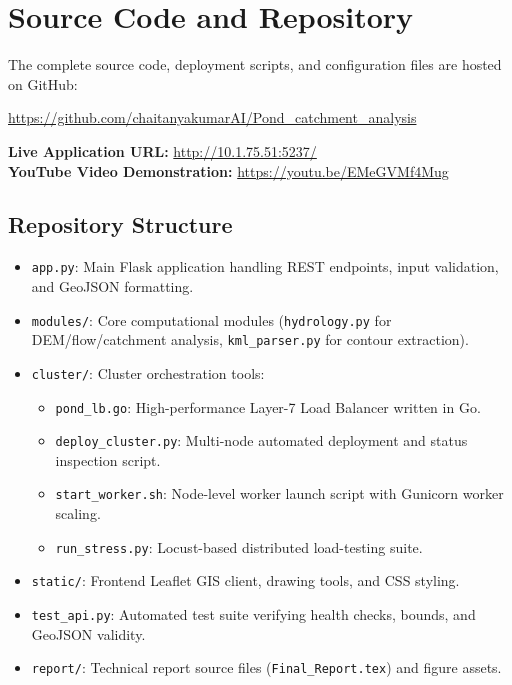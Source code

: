 \documentclass[manuscript,screen,review]{acmart}
\begin{document}
\appendix

\section{Source Code and Repository}
\label{sec:repo}
The complete source code, deployment scripts, and configuration files are hosted on GitHub:
\begin{center}
\url{https://github.com/chaitanyakumarAI/Pond_catchment_analysis}
\end{center}
\textbf{Live Application URL:} \url{http://10.1.75.51:5237/} \\
\textbf{YouTube Video Demonstration:} \url{https://youtu.be/EMeGVMf4Mug}

\subsection{Repository Structure}
\begin{itemize}
    \item \texttt{app.py}: Main Flask application handling REST endpoints, input validation, and GeoJSON formatting.
    \item \texttt{modules/}: Core computational modules (\texttt{hydrology.py} for DEM/flow/catchment analysis, \texttt{kml\_parser.py} for contour extraction).
    \item \texttt{cluster/}: Cluster orchestration tools:
    \begin{itemize}
        \item \texttt{pond\_lb.go}: High-performance Layer-7 Load Balancer written in Go.
        \item \texttt{deploy\_cluster.py}: Multi-node automated deployment and status inspection script.
        \item \texttt{start\_worker.sh}: Node-level worker launch script with Gunicorn worker scaling.
        \item \texttt{run\_stress.py}: Locust-based distributed load-testing suite.
    \end{itemize}
    \item \texttt{static/}: Frontend Leaflet GIS client, drawing tools, and CSS styling.
    \item \texttt{test\_api.py}: Automated test suite verifying health checks, bounds, and GeoJSON validity.
    \item \texttt{report/}: Technical report source files (\texttt{Final_Report.tex}) and figure assets.
\end{itemize}
\end{document}
